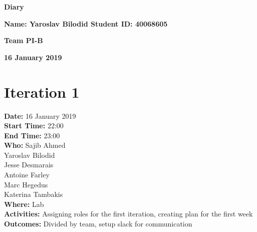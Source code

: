 \documentclass[12pt]{article}
\begin{document}
\vspace*{0.2in}
\centerline{\bf\Large Diary}

\vspace*{0.2in}
\centerline{\bf\Large Name: Yaroslav Bilodid   Student ID: 40068605}

\vspace*{0.2in}
\centerline{\bf\Large Team PI-B}

\vspace*{0.2in}
\centerline{\bf\Large 16 January 2019}

\section{Iteration 1}

{\bf Date:} 16 January 2019\\
{\bf Start Time:} 22:00\\
{\bf End Time:} 23:00 \\
{\bf Who:} Sajib Ahmed \\
Yaroslav Bilodid \\
Jesse Desmarais \\
Antoine Farley \\
Marc Hegedus \\
Katerina Tambakis \\
{\bf Where:} Lab \\
{\bf Activities:} Assigning roles for the first iteration, creating plan for the first week\\
{\bf Outcomes:} Divided by team, setup slack for communication\\


\end{document}
